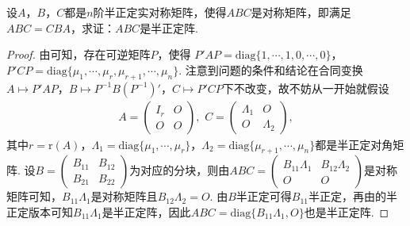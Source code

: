 \documentclass[../../main.tex]{subfiles}%
\begin{document}
\begin{proposition}\label{proposition:两个半正定阵可同时合同对角化4}
设\(A\)，\(B\)，\(C\)都是\(n\)阶半正定实对称矩阵，使得\(ABC\)是对称矩阵，即满足\(ABC = CBA\)，求证：\(ABC\)是半正定阵.
\end{proposition}
\begin{proof}

由可知，存在可逆矩阵\(P\)，使得
\(P'AP = \mathrm{diag}\{1,\cdots,1,0,\cdots,0\}\)，\(P'CP = \mathrm{diag}\{\mu_1,\cdots,\mu_r,\mu_{r + 1},\cdots,\mu_n\}\).
注意到问题的条件和结论在合同变换\(A\mapsto P'AP\)，\(B\mapsto P^{-1}B(P^{-1})'\)，\(C\mapsto P'CP\)下不改变，故不妨从一开始就假设
\begin{align*}
A=\begin{pmatrix}I_r&O\\O&O\end{pmatrix},\,\,C=\begin{pmatrix}\Lambda_1&O\\O&\Lambda_2\end{pmatrix},
\end{align*}
其中\(r = \mathrm{r}(A)\)，\(\Lambda_1 = \mathrm{diag}\{\mu_1,\cdots,\mu_r\}\)，\(\Lambda_2 = \mathrm{diag}\{\mu_{r + 1},\cdots,\mu_n\}\)都是半正定对角矩阵. 设\(B=\begin{pmatrix}B_{11}&B_{12}\\B_{21}&B_{22}\end{pmatrix}\)为对应的分块，则由\(ABC=\begin{pmatrix}B_{11}\Lambda_1&B_{12}\Lambda_2\\O&O\end{pmatrix}\)是对称矩阵可知，\(B_{11}\Lambda_1\)是对称矩阵且\(B_{12}\Lambda_2 = O\). 由\(B\)半正定可得\(B_{11}\)半正定，再由的半正定版本可知\(B_{11}\Lambda_1\)是半正定阵，因此\(ABC = \mathrm{diag}\{B_{11}\Lambda_1,O\}\)也是半正定阵. 

\end{proof}
\end{document}
